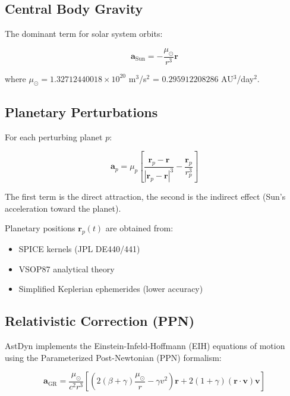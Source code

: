 \subsection{Central Body Gravity}

The dominant term for solar system orbits:

\begin{equation}
    \mathbf{a}_{\text{Sun}} = -\frac{\mu_\odot}{r^3}\mathbf{r}
\end{equation}

where $\mu_\odot = 1.32712440018 \times 10^{20}$ m$^3$/s$^2$ = $0.295912208286$ AU$^3$/day$^2$.

\subsection{Planetary Perturbations}

For each perturbing planet $p$:

\begin{equation}
    \mathbf{a}_p = \mu_p \left[\frac{\mathbf{r}_p - \mathbf{r}}{|\mathbf{r}_p - \mathbf{r}|^3} - \frac{\mathbf{r}_p}{r_p^3}\right]
\end{equation}

The first term is the direct attraction, the second is the indirect effect (Sun's acceleration toward the planet).

Planetary positions $\mathbf{r}_p(t)$ are obtained from:
\begin{itemize}
    \item SPICE kernels (JPL DE440/441)
    \item VSOP87 analytical theory
    \item Simplified Keplerian ephemerides (lower accuracy)
\end{itemize}

\subsection{Relativistic Correction (PPN)}

AstDyn implements the Einstein-Infeld-Hoffmann (EIH) equations of motion using the Parameterized Post-Newtonian (PPN) formalism:

\begin{equation}
    \mathbf{a}_{\text{GR}} = \frac{\mu_\odot}{c^2 r^3} \left[ \left(2(\beta+\gamma)\frac{\mu_\odot}{r} - \gamma v^2\right)\mathbf{r} + 2(1+\gamma)(\mathbf{r} \cdot \mathbf{v})\mathbf{v} \right]
\end{equation}

